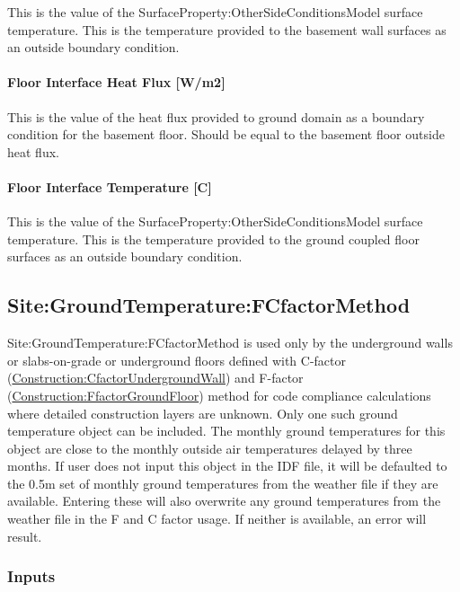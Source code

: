 This is the value of the SurfaceProperty:OtherSideConditionsModel surface temperature. This is the temperature provided to the basement wall surfaces as an outside boundary condition.

\paragraph{Floor Interface Heat Flux {[}W/m2{]}}\label{floor-interface-heat-flux-wm2}

This is the value of the heat flux provided to ground domain as a boundary condition for the basement floor. Should be equal to the basement floor outside heat flux.

\paragraph{Floor Interface Temperature {[}C{]}}\label{floor-interface-temperature-c}

This is the value of the SurfaceProperty:OtherSideConditionsModel surface temperature. This is the temperature provided to the ground coupled floor surfaces as an outside boundary condition.

\subsection{Site:GroundTemperature:FCfactorMethod}\label{sitegroundtemperaturefcfactormethod}

Site:GroundTemperature:FCfactorMethod is used only by the underground walls or slabs-on-grade or underground floors defined with C-factor (\hyperref[constructioncfactorundergroundwall]{Construction:CfactorUndergroundWall}) and F-factor (\hyperref[constructionffactorgroundfloor]{Construction:FfactorGroundFloor}) method for code compliance calculations where detailed construction layers are unknown. Only one such ground temperature object can be included. The monthly ground temperatures for this object are close to the monthly outside air temperatures delayed by three months. If user does not input this object in the IDF file, it will be defaulted to the 0.5m set of monthly ground temperatures from the weather file if they are available. Entering these will also overwrite any ground temperatures from the weather file in the F and C factor usage. If neither is available, an error will result.

\subsubsection{Inputs}\label{inputs-18-004}

